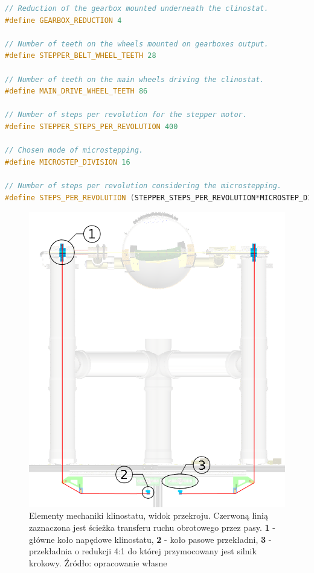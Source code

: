 \begin{lstlisting}[language=C++, caption=clinostat\_mechanics.hpp]
// Reduction of the gearbox mounted underneath the clinostat.
#define GEARBOX_REDUCTION 4 

// Number of teeth on the wheels mounted on gearboxes output.
#define STEPPER_BELT_WHEEL_TEETH 28 

// Number of teeth on the main wheels driving the clinostat.
#define MAIN_DRIVE_WHEEL_TEETH 86 

// Number of steps per revolution for the stepper motor.
#define STEPPER_STEPS_PER_REVOLUTION 400 

// Chosen mode of microstepping.
#define MICROSTEP_DIVISION 16 

// Number of steps per revolution considering the microstepping.
#define STEPS_PER_REVOLUTION (STEPPER_STEPS_PER_REVOLUTION*MICROSTEP_DIVISION)
\end{lstlisting}

\begin{figure}[h]
	
	\centering
	\includegraphics[scale=0.3]{klinostat_przekroj}
	\caption{Elementy mechaniki klinostatu, widok przekroju. Czerwoną linią zaznaczona jest ścieżka transferu ruchu obrotowego przez pasy. \textbf{1} - główne koło napędowe klinostatu, \textbf{2} - koło pasowe przekładni, \textbf{3} - przekładnia o redukcji 4:1 do której przymocowany jest silnik krokowy. Źródło: opracowanie własne} 
	\label{fig:klinostat_mechanika}
\end{figure}

